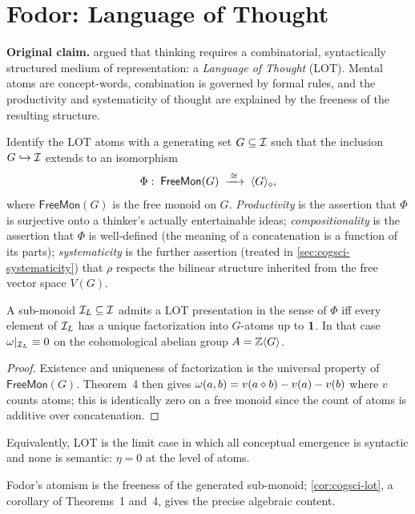 \section{Fodor: Language of Thought}\label{sec:cogsci-lot}

\textbf{Original claim.} \citet{Fodor1975} argued that thinking requires a
combinatorial, syntactically structured medium of representation: a
\emph{Language of Thought} (LOT). Mental atoms are concept-words,
combination is governed by formal rules, and the productivity and
systematicity of thought are explained by the freeness of the resulting
structure.

\formalclaim Identify the LOT atoms with a generating set
$G\subseteq\mathcal{I}$ such that the inclusion $G\hookrightarrow\mathcal{I}$ extends
to an isomorphism
\[
  \Phi:\;\mathsf{FreeMon}(G)\;\xrightarrow{\;\cong\;}\;\langle G\rangle_{\mathbin{\diamond}},
\]
where $\mathsf{FreeMon}(G)$ is the free monoid on $G$. \emph{Productivity}
is the assertion that $\Phi$ is surjective onto a thinker's actually
entertainable ideas; \emph{compositionality} is the assertion that $\Phi$
is well-defined (the meaning of a concatenation is a function of its
parts); \emph{systematicity} is the further assertion (treated in
\cref{sec:cogsci-systematicity}) that $\rho$ respects the bilinear
structure inherited from the free vector space $V(G)$.

\begin{corollary}\label{cor:cogsci-lot}
A sub-monoid $\mathcal{I}_L\subseteq\mathcal{I}$ admits a LOT presentation in the
sense of $\Phi$ iff every element of $\mathcal{I}_L$ has a unique factorization
into $G$-atoms up to $\mathbf{1}$. In that case $\omega|_{\mathcal{I}_L}\equiv 0$
on the cohomological abelian group $A=\mathbb{Z}\langle G\rangle$.
\end{corollary}

\begin{proof}
Existence and uniqueness of factorization is the universal property of
$\mathsf{FreeMon}(G)$. Theorem~4 then gives $\omega(a,b)=v(a\mathbin{\diamond} b)
- v(a)-v(b)$ where $v$ counts atoms; this is identically zero on a free
monoid since the count of atoms is additive over concatenation.
\end{proof}

Equivalently, LOT is the limit case in which all conceptual emergence is
syntactic and none is semantic: $\eta=0$ at the level of atoms.

\formalstatus Fodor's atomism is the freeness of the generated sub-monoid;
\cref{cor:cogsci-lot}, a corollary of Theorems~1 and~4, gives the precise
algebraic content.

